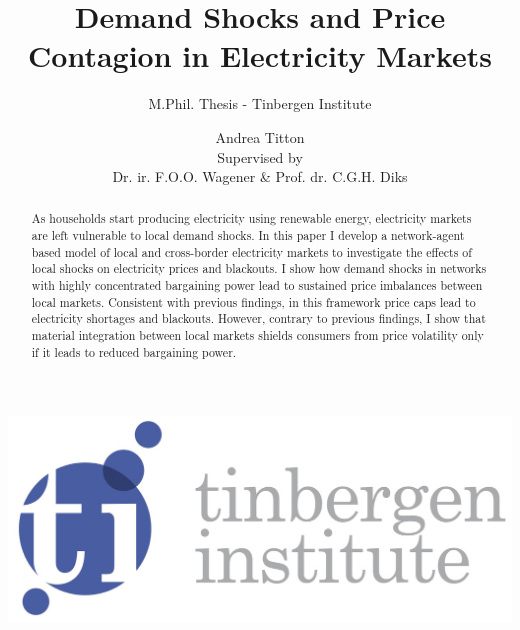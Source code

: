 \documentclass[american]{scrartcl}
\author{Andrea Titton \\[0.5cm]{\large Supervised by \\ Dr. ir. F.O.O. Wagener \& Prof. dr. C.G.H. Diks}}
\title{Demand Shocks and Price Contagion in Electricity Markets}
\subtitle{M.Phil. Thesis - Tinbergen Institute}
\begin{document}
\makeatletter
\begin{titlepage}
    \begin{center}
        \includegraphics[width=0.7\linewidth]{ti_logoblok.jpg}\\[12ex]
        {\huge \bfseries  \@title }\\[4ex]
        {\large \bfseries \@subtitle}\\[8ex]
        {\LARGE  \@author}\\[50ex]
        {\large \@date}
    \end{center}
\end{titlepage}
\makeatother

\thispagestyle{empty}
\newpage

\setcounter{page}{1}

\begin{abstract}
    As households start producing electricity using renewable energy, electricity markets are left vulnerable to local demand shocks. In this paper I develop a network-agent based model of local and cross-border electricity markets to investigate the effects of local shocks on electricity prices and blackouts. I show how demand shocks in networks with highly concentrated bargaining power lead to sustained price imbalances between local markets. Consistent with previous findings, in this framework price caps lead to electricity shortages and blackouts. However, contrary to previous findings, I show that material integration between local markets shields consumers from price volatility only if it leads to reduced bargaining power.
\end{abstract}














\newpage
\printbibliography
{} %
\newpage
\appendix


\end{document}
